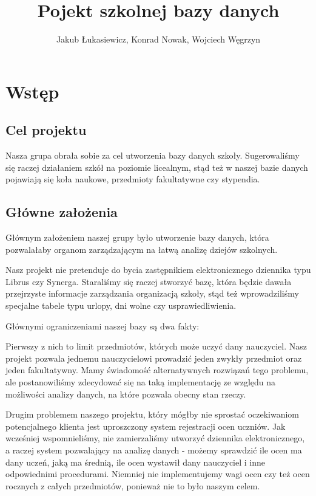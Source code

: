 \documentclass[60pt]{article}
\title{Pojekt szkolnej bazy danych}
\author{Jakub Łukasiewicz, Konrad Nowak, Wojciech Węgrzyn}
\begin{document}
\maketitle

\newpage
\tableofcontents

\newpage
\section{Wstęp}

\subsection{Cel projektu}

Nasza grupa obrała sobie za cel utworzenia bazy danych szkoły. Sugerowaliśmy się raczej działaniem szkół na poziomie licealnym, stąd też w naszej bazie danych pojawiają się koła naukowe, przedmioty fakultatywne czy stypendia. 

\subsection{Główne założenia}

Głównym założeniem naszej grupy było utworzenie bazy danych, która pozwalałaby organom zarządzającym na łatwą analizę dziejów szkolnych. 

Nasz projekt nie pretenduje do bycia zastępnikiem elektronicznego dziennika typu Librus czy Synerga. Staraliśmy się raczej stworzyć bazę, która będzie dawała przejrzyste informacje zarządzania organizacją szkoły, stąd też wprowadziliśmy specjalne tabele typu urlopy, dni wolne czy usprawiedliwienia. 

Głównymi ograniczeniami naszej bazy są dwa fakty:

Pierwszy z nich to limit przedmiotów, których może uczyć dany nauczyciel. Nasz projekt pozwala jednemu nauczycielowi prowadzić jeden zwykły przedmiot oraz jeden fakultatywny. Mamy świadomość alternatywnych rozwiązań tego problemu, ale postanowiliśmy zdecydować się na taką implementację ze względu na możliwości analizy danych, na które pozwala obecny stan rzeczy. 

Drugim problemem naszego projektu, który mógłby nie sprostać oczekiwaniom potencjalnego klienta jest uproszczony system rejestracji ocen uczniów. Jak wcześniej wspomnieliśmy, nie zamierzaliśmy utworzyć dziennika elektronicznego, a raczej system pozwalający na analizę danych - możemy sprawdzić ile ocen ma dany uczeń, jaką ma średnią, ile ocen wystawił dany nauczyciel i inne odpowiednimi procedurami. Niemniej nie implementujemy wagi ocen czy też ocen rocznych z całych przedmiotów, ponieważ nie to było naszym celem.
\end{document}
